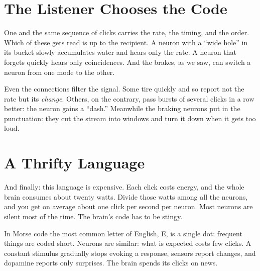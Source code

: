 
\section*{The Listener Chooses the Code}

One and the same sequence of clicks carries the rate, the timing, and the order. Which of these gets read is up to the recipient. A neuron with a ``wide hole'' in its bucket slowly accumulates water and hears only the rate. A neuron that forgets quickly hears only coincidences. And the brakes, as we saw, can switch a neuron from one mode to the other.

Even the connections filter the signal. Some tire quickly and so report not the rate but its \emph{change}. Others, on the contrary, pass bursts of several clicks in a row better: the neuron gains a ``dash.'' Meanwhile the braking neurons put in the punctuation: they cut the stream into windows and turn it down when it gets too loud.

\section*{A Thrifty Language}

And finally: this language is expensive. Each click costs energy, and the whole brain consumes about twenty watts. Divide those watts among all the neurons, and you get on average about one click per second per neuron. Most neurons are silent most of the time. The brain's code has to be stingy.

In Morse code the most common letter of English, E, is a single dot: frequent things are coded short. Neurons are similar: what is expected costs few clicks. A constant stimulus gradually stops evoking a response, sensors report changes, and dopamine reports only surprises. The brain spends its clicks on news.

